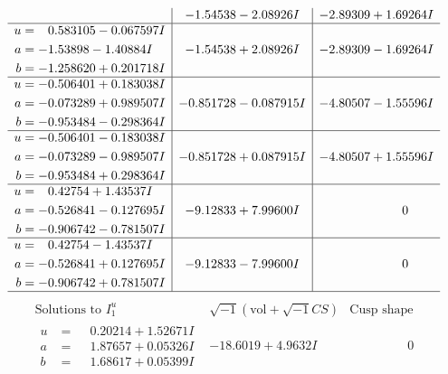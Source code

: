 \documentclass[1p]{elsarticle_modified}
\theoremstyle{definition}
\newcommand{\I}{\sqrt{-1}}
\begin{document}
$$\begin{array}{c|c|c}
 & -1.54538 - 2.08926 I & -2.89309 + 1.69264 I \\ \hline\begin{aligned}
u &= \phantom{-}0.583105 - 0.067597 I \\
a &= -1.53898 - 1.40884 I \\
b &= -1.258620 + 0.201718 I\end{aligned}
 & -1.54538 + 2.08926 I & -2.89309 - 1.69264 I \\ \hline\begin{aligned}
u &= -0.506401 + 0.183038 I \\
a &= -0.073289 + 0.989507 I \\
b &= -0.953484 - 0.298364 I\end{aligned}
 & -0.851728 - 0.087915 I & -4.80507 - 1.55596 I \\ \hline\begin{aligned}
u &= -0.506401 - 0.183038 I \\
a &= -0.073289 - 0.989507 I \\
b &= -0.953484 + 0.298364 I\end{aligned}
 & -0.851728 + 0.087915 I & -4.80507 + 1.55596 I \\ \hline\begin{aligned}
u &= \phantom{-}0.42754 + 1.43537 I \\
a &= -0.526841 - 0.127695 I \\
b &= -0.906742 - 0.781507 I\end{aligned}
 & -9.12833 + 7.99600 I & \phantom{-0.000000 } 0 \\ \hline\begin{aligned}
u &= \phantom{-}0.42754 - 1.43537 I \\
a &= -0.526841 + 0.127695 I \\
b &= -0.906742 + 0.781507 I\end{aligned}
 & -9.12833 - 7.99600 I & \phantom{-0.000000 } 0\\
 \hline 
 \end{array}$$\newpage$$\begin{array}{c|c|c}  
\text{Solutions to }I^u_{1}& \I (\text{vol} + \sqrt{-1}CS) & \text{Cusp shape}\\
 \hline 
\begin{aligned}
u &= \phantom{-}0.20214 + 1.52671 I \\
a &= \phantom{-}1.87657 + 0.05326 I \\
b &= \phantom{-}1.68617 + 0.05399 I\end{aligned}
 & -18.6019 + 4.9632 I & \phantom{-0.000000 } 0 \\ \hline\begin{aligned}

\end{aligned}
\end{array}$$
\end{document}
